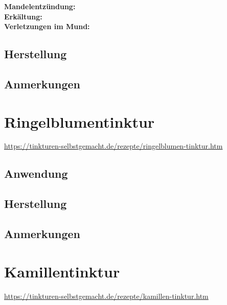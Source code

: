 \textbf{Mandelentzündung:} \\

\textbf{Erkältung:} \\ 

\textbf{Verletzungen im Mund:} \\

\subsection{Herstellung}

\subsection{Anmerkungen}



\newpage



\section{Ringelblumentinktur}

\cite{tinkturen}

\url{https://tinkturen-selbstgemacht.de/rezepte/ringelblumen-tinktur.htm}


\subsection{Anwendung} 

\subsection{Herstellung}

\subsection{Anmerkungen}



\newpage



\section{Kamillentinktur}

\cite{tinkturen}

\url{https://tinkturen-selbstgemacht.de/rezepte/kamillen-tinktur.htm}

